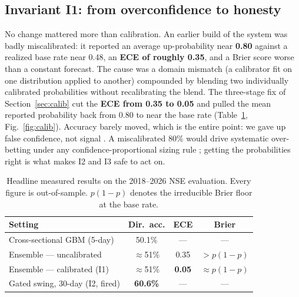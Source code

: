 \documentclass[conference]{IEEEtran}
\begin{document}
\subsection{Invariant I1: from overconfidence to honesty}
No change mattered more than calibration. An earlier build of the system was badly
miscalibrated: it reported an average up-probability near \textbf{0.80} against a
realized base rate near 0.48, an \textbf{ECE of roughly 0.35}, and a Brier score
worse than a constant forecast. The cause was a domain mismatch (a calibrator fit
on one distribution applied to another) compounded by blending two individually
calibrated probabilities without recalibrating the blend. The three-stage fix of
Section~\ref{sec:calib} cut the \textbf{ECE from 0.35 to 0.05} and pulled the mean
reported probability back from 0.80 to near the base rate
(Table~\ref{tab:headline}, Fig.~\ref{fig:calib}). Accuracy barely moved, which is
the entire point: we gave up false confidence, not signal \cite{guo2017}. A
miscalibrated 80\% would drive systematic over-betting under any
confidence-proportional sizing rule \cite{kelly1956}; getting the probabilities
right is what makes I2 and I3 safe to act on.

\begin{table}[t]
\centering
\caption{Headline measured results on the 2018--2026 NSE evaluation. Every figure
is out-of-sample. $p(1{-}p)$ denotes the irreducible Brier floor at the base rate.}
\label{tab:headline}
\renewcommand{\arraystretch}{1.2}
\small
\begin{tabular}{@{}l c c c@{}}
\toprule
\textbf{Setting} & \textbf{Dir.\ acc.} & \textbf{ECE} & \textbf{Brier} \\
\midrule
Cross-sectional GBM (5-day)        & 50.1\%         & ---            & ---            \\
Ensemble --- uncalibrated          & $\approx$51\%  & 0.35           & $>p(1{-}p)$    \\
Ensemble --- calibrated (I1)       & $\approx$51\%  & \textbf{0.05}  & $\approx p(1{-}p)$ \\
Gated swing, 30-day (I2, fired)    & \textbf{60.6\%}& ---            & ---            \\
\bottomrule
\end{tabular}
\end{table}
\end{document}
